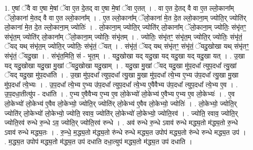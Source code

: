 \documentclass[17pt]{extarticle}
\begin{document}
1. ए॒षां ॅवै वा ए॒षा मे॒षां ॅवा ए॒त दे॒तद् वा ए॒षा मे॒षां ॅवा ए॒तत् । . वा ए॒त दे॒तद् वै वा ए॒त ल्लो॒काना᳚म् ॅलो॒काना॑ मे॒तद् वै वा ए॒त ल्लो॒काना᳚म् । . ए॒त ल्लो॒काना᳚म् ॅलो॒काना॑ मे॒त दे॒त ल्लो॒काना॒म् ज्योति॒र् ज्योति॑र् लो॒काना॑ मे॒त दे॒त ल्लो॒काना॒म् ज्योतिः॑ । . लो॒काना॒म् ज्योति॒र् ज्योति॑र् लो॒काना᳚म् ॅलो॒काना॒म् ज्योतिः॒ संभृ॑तꣳ॒॒ संभृ॑त॒म् ज्योति॑र् लो॒काना᳚म् ॅलो॒काना॒म् ज्योतिः॒ संभृ॑तम् । . ज्योतिः॒ संभृ॑तꣳ॒॒ संभृ॑त॒म् ज्योति॒र् ज्योतिः॒ संभृ॑तं॒ ॅयद् यथ् संभृ॑त॒म् ज्योति॒र् ज्योतिः॒ संभृ॑तं॒ ॅयत् । . संभृ॑तं॒ ॅयद् यथ् संभृ॑तꣳ॒॒ संभृ॑तं॒ ॅयदु॒खोखा यथ् संभृ॑तꣳ॒॒ संभृ॑तं॒ ॅयदु॒खा । . संभृ॑त॒मिति॒ सं - भृ॒त॒म् । . यदु॒खोखा यद् यदु॒खा यद् यदु॒खा यद् यदु॒खा यत् । . उ॒खा यद् यदु॒खोखा यदु॒खा मु॒खां ॅयदु॒खोखा यदु॒खाम् । . यदु॒खा मु॒खां ॅयद् यदु॒खा मु॑प॒दधा᳚ त्युप॒दधा᳚ त्यु॒खां ॅयद् यदु॒खा मु॑प॒दधा॑ति । . उ॒खा मु॑प॒दधा᳚ त्युप॒दधा᳚ त्यु॒खा मु॒खा मु॑प॒दधा᳚ त्ये॒भ्य ए॒भ्य उ॑प॒दधा᳚ त्यु॒खा मु॒खा मु॑प॒दधा᳚ त्ये॒भ्यः । . उ॒प॒दधा᳚ त्ये॒भ्य ए॒भ्य उ॑प॒दधा᳚ त्युप॒दधा᳚ त्ये॒भ्य ए॒वैवैभ्य उ॑प॒दधा᳚ त्युप॒दधा᳚ त्ये॒भ्य ए॒व । . उ॒प॒दधा॒तीत्यु॑प - दधा॑ति । . ए॒भ्य ए॒वैवैभ्य ए॒भ्य ए॒व लो॒केभ्यो॑ लो॒केभ्य॑ ए॒वैभ्य ए॒भ्य ए॒व लो॒केभ्यः॑ । . ए॒व लो॒केभ्यो॑ लो॒केभ्य॑ ए॒वैव लो॒केभ्यो॒ ज्योति॒र् ज्योति॑र् लो॒केभ्य॑ ए॒वैव लो॒केभ्यो॒ ज्योतिः॑ । . लो॒केभ्यो॒ ज्योति॒र् ज्योति॑र् लो॒केभ्यो॑ लो॒केभ्यो॒ ज्योति॒ रवाव॒ ज्योति॑र् लो॒केभ्यो॑ लो॒केभ्यो॒ ज्योति॒रव॑ । . ज्योति॒ रवाव॒ ज्योति॒र् ज्योति॒रव॑ रुन्धे रु॒न्धे ऽव॒ ज्योति॒र् ज्योति॒रव॑ रुन्धे । . अव॑ रुन्धे रु॒न्धे ऽवाव॑ रुन्धे मद्ध्य॒तो म॑द्ध्य॒तो रु॒न्धे ऽवाव॑ रुन्धे मद्ध्य॒तः । . रु॒न्धे॒ म॒द्ध्य॒तो म॑द्ध्य॒तो रु॑न्धे रुन्धे मद्ध्य॒त उपोप॑ मद्ध्य॒तो रु॑न्धे रुन्धे मद्ध्य॒त उप॑ । . म॒द्ध्य॒त उपोप॑ मद्ध्य॒तो म॑द्ध्य॒त उप॑ दधाति दधा॒त्युप॑ मद्ध्य॒तो म॑द्ध्य॒त उप॑ दधाति । \newline
\end{document}
